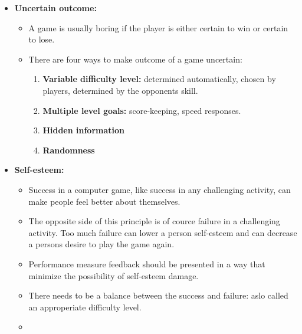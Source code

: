 \begin{itemize}
        \item {\bf Uncertain outcome:}
          \begin{itemize}
            \item A game is usually boring if the player is either certain to win or certain to lose. 
            \item There are four ways to make outcome of a game uncertain:
            \begin{enumerate}
              \item {\bf Variable difficulty level:} determined automatically, chosen by players, determined by the opponents skill.
              \item {\bf Multiple level goals:} score-keeping, speed responses.
              \item {\bf Hidden information}
              \item {\bf Randomness}
            \end{enumerate}
          \end{itemize}
        \item {\bf Self-esteem:}
          \begin{itemize}
            \item Success in a computer game, like success in any challenging activity, can make people feel better about themselves. 
            \item The opposite side of this principle is of cource failure in a challenging activity. Too much failure can lower a person self-esteem and can decrease a persons desire to play the game again.
            \item Performance measure feedback should be presented in a way that minimize the possibility of self-esteem damage. 
            \item There needs to be a balance between the success and failure: aslo called an approperiate difficulty level.
            \item 
          \end{itemize}
      \end{itemize}

